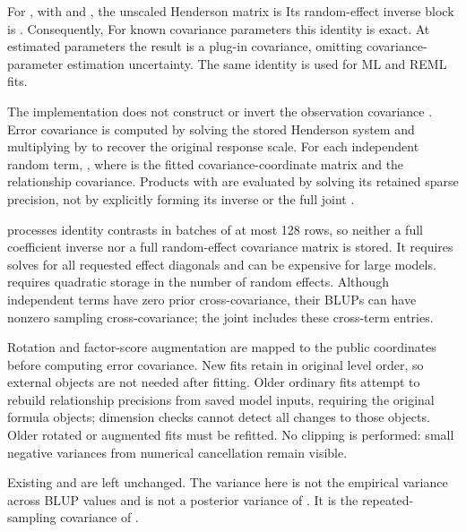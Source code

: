 \documentclass[a4paper]{book}
\begin{document}
\begin{Details}\relax
For , with  and
, the unscaled Henderson matrix is
Its random-effect inverse block is
. Consequently,
For known covariance parameters this identity is exact. At estimated
parameters the result is a plug-in covariance, omitting covariance-parameter
estimation uncertainty. The same identity is used for ML and REML fits.

The implementation does not construct or invert the observation covariance
. Error covariance is computed by solving the stored Henderson
system and multiplying by  to recover the original response
scale. For each independent random term,
, where  is the fitted
covariance-coordinate matrix and  the relationship covariance.
Products with  are evaluated by solving its retained sparse
precision, not by explicitly forming its inverse or the full joint .

 processes identity contrasts in batches of at most 128 rows,
so neither a full coefficient inverse nor a full random-effect covariance
matrix is stored. It requires solves for all requested effect diagonals and
can be expensive for large models.  requires quadratic storage
in the number of random effects. Although independent terms have zero prior
cross-covariance, their BLUPs can have nonzero sampling cross-covariance; the
joint  includes these cross-term entries.

Rotation and factor-score augmentation are mapped to the public
 coordinates before computing error covariance. New fits retain
 in original level order, so external 
objects are not needed after fitting. Older ordinary fits attempt to rebuild
relationship precisions from saved model inputs, requiring the original
formula objects; dimension checks cannot detect all changes to those objects.
Older rotated or augmented fits must be refitted. No clipping is performed:
small negative variances from numerical cancellation remain visible.

Existing  and  are left unchanged. The variance here
is not the empirical variance across BLUP values and is not a posterior
variance of . It is the repeated-sampling covariance of .
\end{Details}
\end{document}
